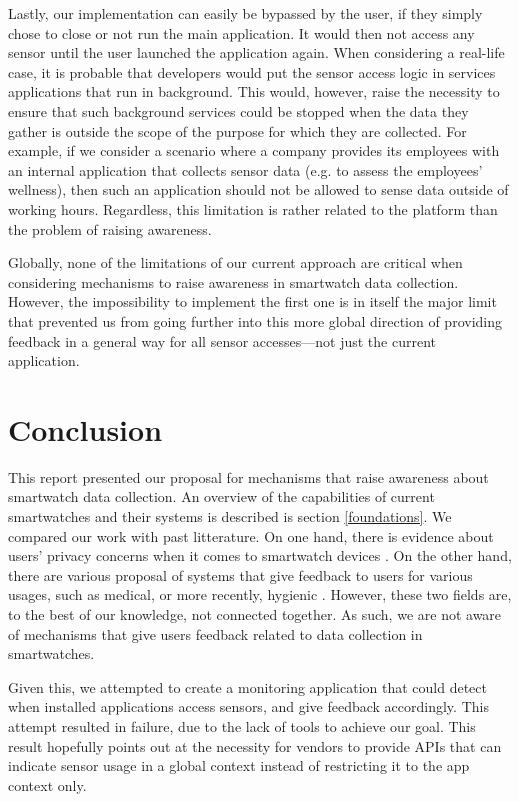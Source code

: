 \documentclass[conference, a4paper, 10pt, twocolumn]{IEEEtran}
\begin{document}
Lastly, our implementation can easily be bypassed by the user, if they simply chose to close or not run the main application. It would then not access any sensor until the user launched the application again. When considering a real-life case, it is probable that developers would put the sensor access logic in services applications that run in background. This would, however, raise the necessity to ensure that such background services could be stopped when the data they gather is outside the scope of the purpose for which they are collected. For example, if we consider a scenario where a company provides its employees with an internal application that collects sensor data (e.g. to assess the employees' wellness), then such an application should not be allowed to sense data outside of working hours. Regardless, this limitation is rather related to the platform than the problem of raising awareness. 

Globally, none of the limitations of our current approach are critical when considering mechanisms to raise awareness in smartwatch data collection. However, the impossibility to implement the first one is in itself the major limit that prevented us from going further into this more global direction of providing feedback in a general way for all sensor accesses---not just the current application.

\section{Conclusion}
This report presented our proposal for mechanisms that raise awareness about smartwatch data collection. An overview of the capabilities of current smartwatches and their systems is described is section \ref{foundations}. We compared our work with past litterature. On one hand, there is evidence about users' privacy concerns when it comes to smartwatch devices \cite{}. On the other hand, there are various proposal of systems that give feedback to users for various usages, such as medical, or more recently, hygienic \cite{}. However, these two fields are, to the best of our knowledge, not connected together. As such, we are not aware of mechanisms that give users feedback related to data collection in smartwatches. 

Given this, we attempted to create a monitoring application that could detect when installed applications access sensors, and give feedback accordingly. This attempt resulted in failure, due to the lack of tools to achieve our goal. This result hopefully points out at the necessity for vendors to provide \acp{API} that can indicate sensor usage in a global context instead of restricting it to the app context only. 
\end{document}
